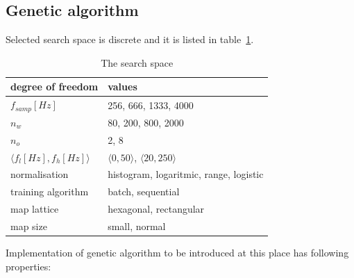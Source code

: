 \documentclass[a4paper]{IEEEtran}
\begin{document}
\subsection{Genetic algorithm}
Selected search space is discrete and it is listed  in table~\ref{searchspace}.%
\begin{table}[h]
\caption{The search space}
	\begin{center}
		\begin{tabular}{|l| l |}
			\hline
			degree of freedom & values \\
			\hline
			\hline
			$ f_{samp} [Hz] $ & 256, 666, 1333, 4000\\
			\hline
			$ n_w $ & 80, 200, 800, 2000 \\
			\hline
			$ n_o $ & 2, 8 \\
			\hline
			$ \langle f_l[Hz], f_h[Hz] \rangle $ & $ \langle 0, 50\rangle $,  
			$ \langle 20, 250\rangle $  \\
			\hline
			normalisation & histogram, logaritmic, range, logistic \\
			\hline
			training algorithm & batch, sequential  \\
			\hline
			map lattice & hexagonal, rectangular \\
			\hline
			map size  & small, normal \\
			\hline
		\end{tabular}
	\end{center}
\label{searchspace}
\end{table}



Implementation of genetic algorithm to be introduced at this place
has following properties:
\end{document}
